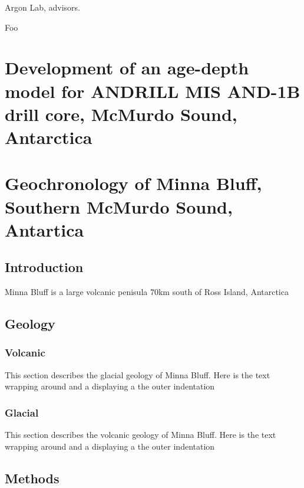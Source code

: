 \documentclass[12pt]{report}
\begin{document}
\begin{acknowledgments}
{Argon Lab, advisors.}

\end{acknowledgments}
\tableofcontents
%
%
\listoftables
\listoffigures
\signaturepage
\begin{preface}
{Foo}
\end{preface}

\chapter{Development of an age-depth model for ANDRILL MIS AND-1B drill core, McMurdo Sound, Antarctica}
\chapter{Geochronology of Minna Bluff, Southern McMurdo Sound, Antartica}
\section{Introduction}
Minna Bluff is a large volcanic penisula 70km south of Ross Island, Antarctica
\section{Geology}
\subsection{Volcanic}
This section describes the glacial geology of Minna Bluff. Here is the text
wrapping around and a displaying a the outer indentation
\subsection{Glacial}
This section describes the volcanic geology of Minna Bluff. Here is the text
wrapping around and a displaying a the outer indentation
\section{Methods}
\end{document}

